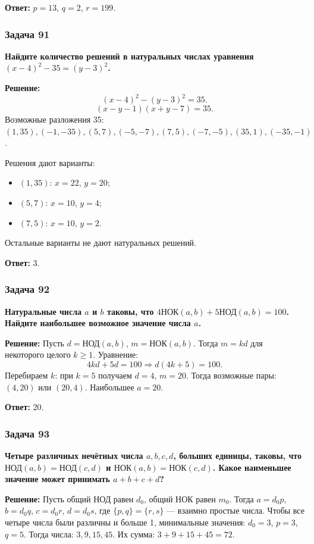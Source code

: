 \documentclass[12pt, a4paper]{article}
\begin{document}
\textbf{Ответ:} $p=13$, $q=2$, $r=199$.\

\subsubsection*{Задача 91}
\textbf{Найдите количество решений в натуральных числах уравнения $(x-4)^2 - 35 = (y-3)^2$.}

\textbf{Решение:}
\[
(x-4)^2 - (y-3)^2 = 35.
\]
\[
(x-y-1)(x+y-7) = 35.
\]
Возможные разложения 35: $(1,35), (-1,-35), (5,7), (-5,-7), (7,5), (-7,-5), (35,1), (-35,-1)$.

Решения дают варианты:
\begin{itemize}
    \item $(1, 35)$: $x=22$, $y=20$;
    \item $(5, 7)$: $x=10$, $y=4$;
    \item $(7, 5)$: $x=10$, $y=2$.
\end{itemize}
Остальные варианты не дают натуральных решений.

\textbf{Ответ:} 3.

\subsubsection*{Задача 92}
\textbf{Натуральные числа $a$ и $b$ таковы, что $4\text{НОК}(a,b) + 5\text{НОД}(a,b) = 100$. Найдите наибольшее возможное значение числа $a$.}

\textbf{Решение:}
Пусть $d = \text{НОД}(a,b)$, $m = \text{НОК}(a,b)$. Тогда $m = kd$ для некоторого целого $k \ge 1$. Уравнение:
\[
4kd + 5d = 100 \Rightarrow d(4k+5) = 100.
\]
Перебираем $k$: при $k=5$ получаем $d=4$, $m=20$. Тогда возможные пары: $(4, 20)$ или $(20, 4)$. Наибольшее $a = 20$.

\textbf{Ответ:} 20.

\subsubsection*{Задача 93}
\textbf{Четыре различных нечётных числа $a, b, c, d$, больших единицы, таковы, что $\text{НОД}(a,b) = \text{НОД}(c,d)$ и $\text{НОК}(a,b) = \text{НОК}(c,d)$. Какое наименьшее значение может принимать $a+b+c+d$?}

\textbf{Решение:}
Пусть общий НОД равен $d_0$, общий НОК равен $m_0$. Тогда $a = d_0 p$, $b = d_0 q$, $c = d_0 r$, $d = d_0 s$, где $\{p,q\} = \{r,s\}$ — взаимно простые числа. Чтобы все четыре числа были различны и больше 1, минимальные значения: $d_0 = 3$, $p = 3$, $q = 5$. Тогда числа: $3, 9, 15, 45$. Их сумма: $3+9+15+45 = 72$.
\end{document}
